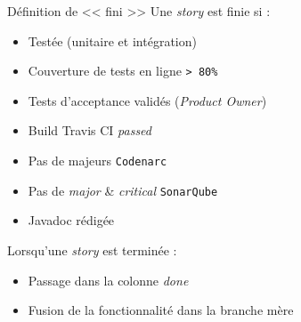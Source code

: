 \begin{frame}{Définition de << fini >>}
	Une \textit{story} est finie si : 
	\vspace{-10px}
	\begin{itemize}
		\item Testée (unitaire et intégration)
		\item Couverture de tests en ligne \texttt{> 80\%}
		\item Tests d'acceptance validés (\textit{Product Owner})
		\item Build Travis CI \textit{passed}
		\item Pas de majeurs \texttt{Codenarc}
		\item Pas de \textit{major} \& \textit{critical} \texttt{SonarQube}
		\item Javadoc rédigée
	\end{itemize}
	\vfill
	\pause
	Lorsqu'une \textit{story} est terminée : 
	\vspace{-10px}
	\begin{itemize}
		\item Passage dans la colonne \textit{done}
		\item Fusion de la fonctionnalité dans la branche mère
	\end{itemize}





\end{frame}
